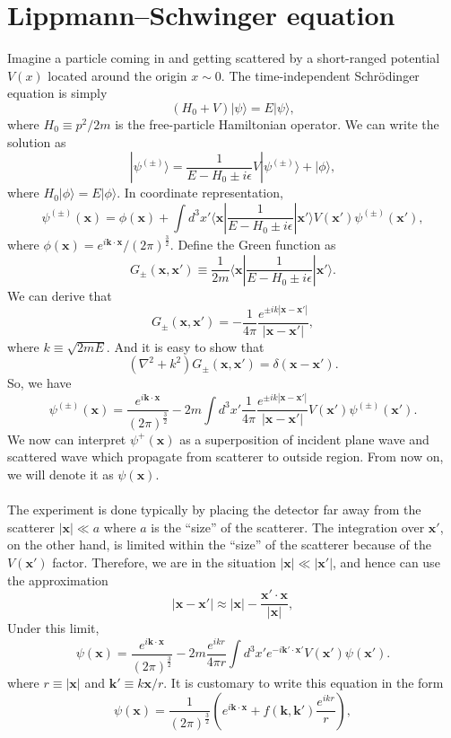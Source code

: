 \section{Lippmann–Schwinger equation}
Imagine a particle coming in and getting scattered by a short-ranged potential $V(x)$ located around the origin $x \sim 0$. The time-independent Schr\"{o}dinger equation is simply
\[(H_0 + V)|\psi\rangle = E |\psi\rangle,\]
where $H_0 \equiv {p^2}/{2m}$ is the free-particle Hamiltonian operator. We can write the solution as
\[|\psi^{(\pm)}\rangle = \frac{1}{E-H_0 \pm i\epsilon}V|\psi^{(\pm)}\rangle + |\phi\rangle,\]
where $H_0 |\phi\rangle = E |\phi\rangle$. In coordinate representation,
\[\psi^{(\pm)}(\mathbf{x}) = \phi(\mathbf{x}) + \int d^3x' \langle \bm{x} | \frac{1}{E-H_0 \pm i\epsilon} | \bm{x}' \rangle V(\bm{x}') \psi^{(\pm)}(\bm{x}'),\]
where $\phi(\bm{x}) = e^{i\bm{k}\cdot\bm{x}} / (2\pi)^{\frac{3}{2}}$. Define the Green function as
\[G_{\pm}(\bm{x},\bm{x}') \equiv \frac{1}{2m} \langle \bm{x} | \frac{1}{E-H_0 \pm i\epsilon} | \bm{x}' \rangle.\]
We can derive that
\[G_{\pm}(\bm{x},\bm{x}') = -\frac{1}{4\pi} \frac{e^{\pm ik|\bm{x}-\bm{x}'|}}{|\bm{x}-\bm{x}'|},\]
where $k \equiv \sqrt{2mE}$. And it is easy to show that
\[(\nabla^2 + k^2)G_{\pm}(\bm{x},\bm{x}') = \delta(\bm{x}-\bm{x}').\]
So, we have
\[\psi^{(\pm)}(\bm{x}) = \frac{e^{i\bm{k}\cdot\bm{x}}}{(2\pi)^{\frac{3}{2}}} - 2m \int d^3x' \frac{1}{4\pi} \frac{e^{\pm ik|\bm{x}-\bm{x}'|}}{|\bm{x}-\bm{x}'|} V(\bm{x}') \psi^{(\pm)}(\bm{x}').\]
We now can interpret $\psi^{+}(\bm{x})$ as a superposition of incident plane wave and scattered wave which propagate from scatterer to outside region. From now on, we will denote it as $\psi(\bm{x})$.
\\ \\
The experiment is done typically by placing the detector far away from the scatterer $|\bm{x}| \ll a$ where $a$ is the ``size'' of the scatterer. The integration over $\bm{x}'$, on the other hand, is limited within the ``size'' of the scatterer because of the $V(\bm{x}')$ factor. Therefore, we are in the situation $|\bm{x}| \ll |\bm{x}'|$, and hence can use the approximation
\[|\bm{x}-\bm{x}'| \approx |\bm{x}| - \frac{\bm{x}' \cdot \bm{x}}{|\bm{x}|},\]
Under this limit,
\[\psi(\bm{x}) = \frac{e^{i\bm{k}\cdot\bm{x}}}{(2\pi)^{\frac{3}{2}}} - 2m \frac{e^{ikr}}{4\pi r} \int d^3x' e^{-i\bm{k}' \cdot \bm{x}'} V(\bm{x}') \psi(\bm{x}').\]
where $r \equiv |\bm{x}|$ and $\bm{k}' \equiv k {\bm{x}}/{r}$. It is customary to write this equation in the form
\[\psi(\bm{x}) = \frac{1}{(2\pi)^{\frac{3}{2}}}\left( e^{i\bm{k}\cdot\bm{x}} +  f(\bm{k},\bm{k}') \frac{e^{ikr}}{r} \right) ,\]
